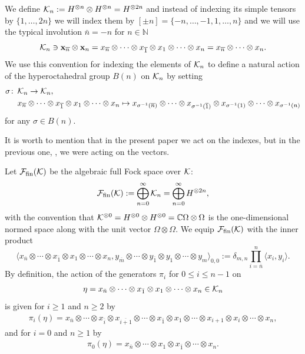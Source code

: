 \documentclass[pdftex]{sigma}
\numberwithin{equation}{section}
\def\C{{\mathbb C}}
\def\N{{\mathbb N}}
\def\F{\mathcal{F}_{\rm fin}(\HH)}
\def\H{{\bf \mathcal K}_{ n}}
\def\HH{{\bf \mathcal K}}
\begin{document}
We define $\H:=H^{\otimes n} \otimes {{H}^{\otimes n}}=H^{\otimes 2n}$ and instead of
indexing its simple tensors by $\{1,\dots,2n\}$ we will index them by $[\pm n]=\{-n,\dots,-1,1,\dots,n\}$ and we will use the
typical involution $\bar n=-n$ for $n\in \N$
\[
\H\ni\mathbf{x}_{\overline n} \otimes \mathbf{x}_n=x_{\overline n}\otimes\cdots \otimes x_{\overline 1} \otimes x_1\otimes\cdots \otimes x_n=x_{\overline n}\otimes \cdots \otimes x_{n}.
\]
We use this convention for indexing the elements of $\H$ to define a natural action of the
hyperoctahedral group $B(n)$ on $\H$ by setting
\begin{align*}
\sigma\colon\, &\H\to \H,
\\
	&x_{\overline n}\otimes\cdots \otimes x_{\overline 1} \otimes x_1\otimes\cdots \otimes x_n\mapsto x_{\sigma^{-1}(\overline n)}\otimes\cdots \otimes x_{\sigma^{-1}(\overline 1)} \otimes x_{\sigma^{-1}(1)}\otimes\cdots \otimes x_{\sigma^{-1}(n)}
\end{align*}
for any $\sigma \in B(n)$.

\begin{Remark}
	It is worth to mention that in the present paper we act on the indexes, but in the previous one, \cite{BozejkoEjsmontHasebe2015}, we were acting on the vectors.
\end{Remark}



Let $\F$ be the algebraic full Fock space over $\HH$:
\begin{equation*}
	\F:= \bigoplus_{n=0}^\infty \H= \bigoplus_{n=0}^\infty H^{\otimes 2n},
\end{equation*}
with the convention that $\HH^{\otimes 0} =H^{\otimes 0} \otimes H^{\otimes 0}=\C\Omega \otimes \Omega$ is the one-dimensional normed space along with the unit vector $\Omega \otimes \Omega$.
We equip $\F$ with the inner product
\[
\langle x_{\overline n} \otimes \cdots \otimes x_{\overline 1} \otimes x_1 \otimes \cdots \otimes x_n, y_{\overline m} \otimes \cdots \otimes y_{\overline 1} \otimes y_1 \otimes \cdots \otimes y_m\rangle_{0,0}:= \delta_{m,n}\prod_{i=\overline n }^n \langle x_i, y_i\rangle.
\]
By definition, the action of the generators $\pi_i$ for $0\leq i \leq n-1$ on
\begin{align*}
\eta = x_{\bar n} \otimes \cdots \otimes x_{\bar 1} \otimes x_1 \otimes \cdots \otimes x_{n}\in \H
\end{align*}
is given for $i\geq 1$ and $n\geq 2$ by
\begin{align*}
\pi_i(\eta) =
	x_{\bar n} \otimes \cdots \otimes x_{\overline{i}} \otimes x_{\overline{i+1}} \otimes \cdots \otimes x_{\bar 1} \otimes x_1 \otimes \cdots \otimes x_{i+1} \otimes x_{i} \otimes \cdots \otimes x_{n}, \end{align*}
and for $i=0$ and $n\geq 1$ by
\begin{align*}
\pi_0(\eta) = x_{\bar n} \otimes \cdots \otimes x_1 \otimes x_{\bar 1}\otimes \cdots \otimes x_{n}.
\end{align*}
\end{document}
